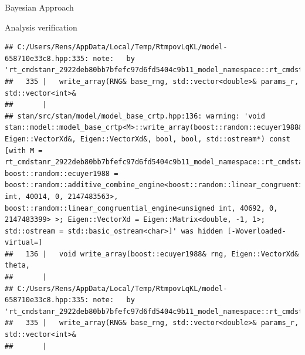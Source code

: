 \documentclass[
  ignorenonframetext,
]{beamer}
\begin{document}
\begin{frame}[fragile]{Bayesian Approach}
\begin{block}{Analysis verification}
\begin{verbatim}
## C:/Users/Rens/AppData/Local/Temp/RtmpovLqKL/model-658710e33c8.hpp:335: note:   by 'rt_cmdstanr_2922deb80bb7bfefc97d6fd5404c9b11_model_namespace::rt_cmdstanr_2922deb80bb7bfefc97d6fd5404c9b11_model::write_array'
##   335 |   write_array(RNG& base_rng, std::vector<double>& params_r, std::vector<int>&
##       | 
## stan/src/stan/model/model_base_crtp.hpp:136: warning: 'void stan::model::model_base_crtp<M>::write_array(boost::random::ecuyer1988&, Eigen::VectorXd&, Eigen::VectorXd&, bool, bool, std::ostream*) const [with M = rt_cmdstanr_2922deb80bb7bfefc97d6fd5404c9b11_model_namespace::rt_cmdstanr_2922deb80bb7bfefc97d6fd5404c9b11_model; boost::random::ecuyer1988 = boost::random::additive_combine_engine<boost::random::linear_congruential_engine<unsigned int, 40014, 0, 2147483563>, boost::random::linear_congruential_engine<unsigned int, 40692, 0, 2147483399> >; Eigen::VectorXd = Eigen::Matrix<double, -1, 1>; std::ostream = std::basic_ostream<char>]' was hidden [-Woverloaded-virtual=]
##   136 |   void write_array(boost::ecuyer1988& rng, Eigen::VectorXd& theta,
##       | 
## C:/Users/Rens/AppData/Local/Temp/RtmpovLqKL/model-658710e33c8.hpp:335: note:   by 'rt_cmdstanr_2922deb80bb7bfefc97d6fd5404c9b11_model_namespace::rt_cmdstanr_2922deb80bb7bfefc97d6fd5404c9b11_model::write_array'
##   335 |   write_array(RNG& base_rng, std::vector<double>& params_r, std::vector<int>&
##       |
\end{verbatim}


\end{block}
\end{frame}
\end{document}
